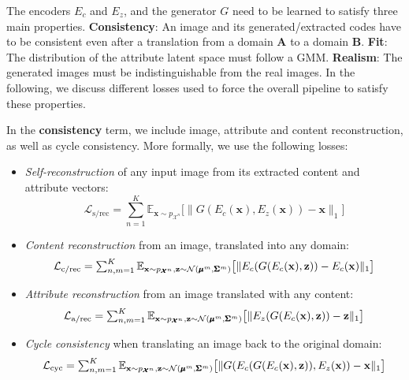 \documentclass[runningheads]{llncs}
\begin{document}
The encoders $E_c$ and $E_z$, and the generator $G$ need to be learned to satisfy three main properties. \textbf{Consistency}: An image and its generated/extracted codes have to be consistent even after a translation from a domain $\pmb{A}$ to a domain $\pmb{B}$. \textbf{Fit}: The distribution of the attribute latent space must follow a GMM. \textbf{Realism}: The generated images must be indistinguishable from the real images. 
In the following, we discuss different losses used to force the overall pipeline to satisfy these properties.

In the \textbf{consistency} term, we include image, attribute and content reconstruction, as well as cycle consistency. More formally, we use the following losses:

\begin{itemize}[leftmargin=*, topsep=4pt]
\item \textit{Self-reconstruction} of any input image from its extracted content and attribute vectors:
\begin{equation*}
    \mathcal{L}_{\textrm{s/rec}} =  \textstyle \sum_{n=1}^K\mathbb{E}_{ \mathbf{x} \sim p_{\pmb{\mathcal{X}}^n}} \big[\|G(E_c(\mathbf{x}),E_z(\mathbf{x})) - \mathbf{x}\|_1 \big] 
    \label{eq:self}
\end{equation*}
\item \textit{Content reconstruction} from an image, translated into any domain:
\begin{dmath*}
    \mathcal{L}_{\textrm{c/rec}} = \textstyle \sum_{n,m=1}^K\mathbb{E}_{\mathbf{x}\sim p_{\pmb{\mathcal{X}}^n}, \mathbf{z}\sim {\cal N}(\pmb{\mu}^m, \pmb{\Sigma}^m)} \big[\| E_c(G(E_c(\mathbf{x}), \mathbf{z})) - E_c(\mathbf{x})\|_1 \big]
    \label{eq:cont}
\end{dmath*}

\item \textit{Attribute reconstruction} from an image translated with any content:
\begin{dmath*}
    \mathcal{L}_{\textrm{a/rec}} = \textstyle \sum_{n,m=1}^K\mathbb{E}_{\mathbf{x}\sim p_{\pmb{\mathcal{X}}^n}, \mathbf{z}\sim {\cal N}(\pmb{\mu}^m, \pmb{\Sigma}^m)} \big[\| E_z(G(E_c(\mathbf{x}), \mathbf{z})) - \mathbf{z}\|_1 \big]
    \label{eq:attr}
\end{dmath*}
\item \textit{Cycle consistency} when translating an image back to the original domain:
\begin{dmath*}
    \mathcal{L}_{\textrm{cyc}} = \textstyle \sum_{n,m=1}^K \mathbb{E}_{\mathbf{x}\sim p_{\pmb{\mathcal{X}}^n},\mathbf{z}\sim {\cal N}(\pmb{\mu}^m, \pmb{\Sigma}^m)}
    \big[\| G(E_c(G(E_c(\mathbf{x}), \mathbf{z})), E_z(\mathbf{x})) -\mathbf{x}  \|_1\big]
    \label{eq:cyc}
\end{dmath*}
\end{itemize}
\end{document}
